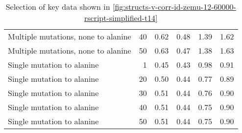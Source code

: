 \begin{table}
\begin{tabular}{lrrrrr}
 Multiple mutations, none to alanine &          40 &          0.62 &                    0.48 &            1.39 &                      1.62 \\
 Multiple mutations, none to alanine &          50 &          0.63 &                    0.47 &            1.38 &                      1.63 \\
          Single mutation to alanine &           1 &          0.45 &                    0.43 &            0.98 &                      0.91 \\
          Single mutation to alanine &          20 &          0.50 &                    0.44 &            0.77 &                      0.89 \\
          Single mutation to alanine &          30 &          0.51 &                    0.44 &            0.76 &                      0.90 \\
          Single mutation to alanine &          40 &          0.51 &                    0.44 &            0.75 &                      0.90 \\
          Single mutation to alanine &          50 &          0.51 &                    0.44 &            0.75 &                      0.90 \\
\bottomrule
\end{tabular}

\caption[]{Selection of key data shown in \cref{fig:structs-v-corr-id-zemu-12-60000-rscript-simplified-t14}}
\label{tab:structs-v-corr-id-zemu-12-60000-rscript-simplified-t14-underlying-data}
\end{table}
